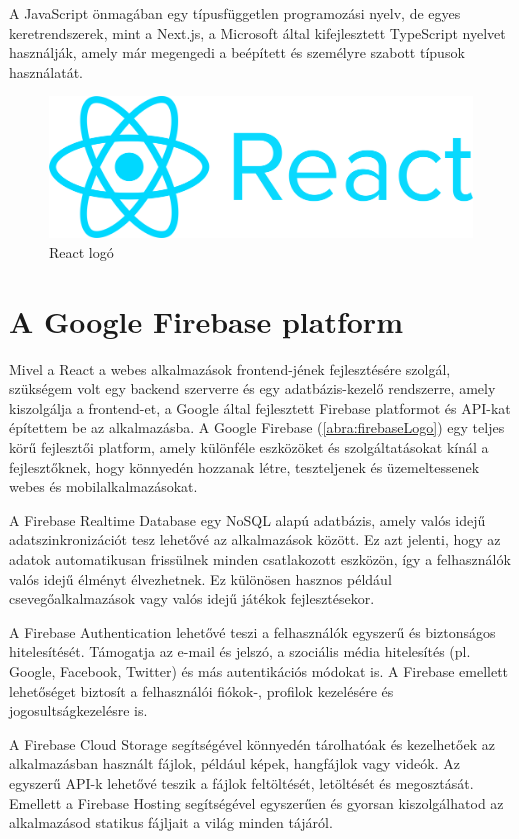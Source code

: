 A JavaScript önmagában egy típusfüggetlen programozási nyelv, de egyes keretrendszerek, mint a Next.js, a Microsoft által kifejlesztett TypeScript nyelvet használják, amely már megengedi a beépített és személyre szabott típusok használatát.

\begin{figure}[!h]
	\centering
	\includegraphics[scale=0.02]{images/reactLogo}
	\caption{React logó}
	\label{abra:reactLogo}
\end{figure}

\section {A Google Firebase platform}

Mivel a React a webes alkalmazások frontend-jének fejlesztésére szolgál, szükségem volt egy backend szerverre és egy adatbázis-kezelő rendszerre, amely kiszolgálja a frontend-et, a Google által fejlesztett Firebase platformot és API-kat építettem be az alkalmazásba.
A Google Firebase (\ref{abra:firebaseLogo}) egy teljes körű fejlesztői platform, amely különféle eszközöket és szolgáltatásokat kínál a fejlesztőknek, hogy könnyedén hozzanak létre, teszteljenek és üzemeltessenek webes és mobilalkalmazásokat.

A Firebase Realtime Database egy NoSQL alapú adatbázis, amely valós idejű adatszinkronizációt tesz lehetővé az alkalmazások között. Ez azt jelenti, hogy az adatok automatikusan frissülnek minden csatlakozott eszközön, így a felhasználók valós idejű élményt élvezhetnek. Ez különösen hasznos például csevegőalkalmazások vagy valós idejű játékok fejlesztésekor. 

A Firebase Authentication lehetővé teszi a felhasználók egyszerű és biztonságos hitelesítését. Támogatja az e-mail és jelszó, a szociális média hitelesítés (pl. Google, Facebook, Twitter) és más autentikációs módokat is. A Firebase emellett lehetőséget biztosít a felhasználói fiókok-, profilok kezelésére és jogosultságkezelésre is. 

\pagebreak
A Firebase Cloud Storage segítségével könnyedén tárolhatóak és kezelhetőek az alkalmazásban használt fájlok, például képek, hangfájlok vagy videók. Az egyszerű API-k lehetővé teszik a fájlok feltöltését, letöltését és megosztását. Emellett a Firebase Hosting segítségével egyszerűen és gyorsan kiszolgálhatod az alkalmazásod statikus fájljait a világ minden tájáról.


